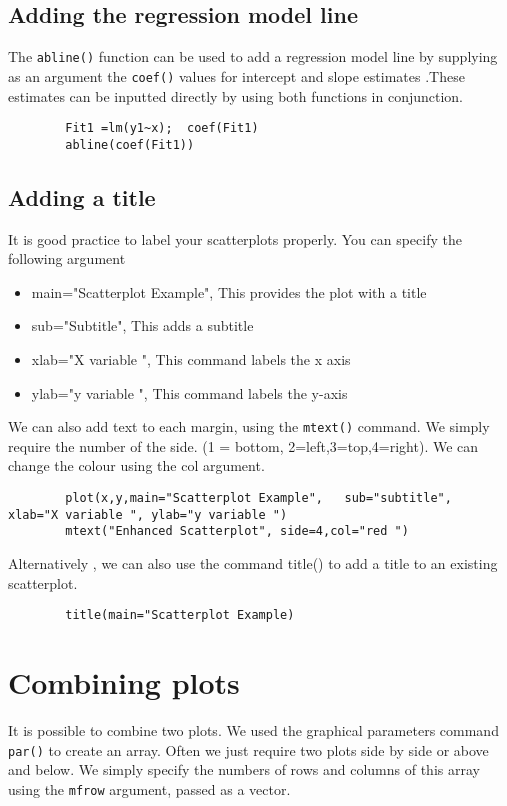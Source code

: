 \documentclass[a4paper,12pt]{article}
\begin{document}
\begin{itemize}
\begin{itemize}
		\subsection{Adding the regression model line}
		
		The \texttt{abline()} function can be used to add a regression model line  by supplying as an argument the \texttt{coef()} values for intercept and slope estimates .These estimates can be inputted directly by using both functions in conjunction.
		
		\large \begin{verbatim}
		Fit1 =lm(y1~x);  coef(Fit1)
		abline(coef(Fit1))	
		\end{verbatim}\large
		
		\subsection{Adding a title }
		
		It is good practice to label your scatterplots properly. You can specify the following argument
		\begin{itemize}
			\item	main="Scatterplot Example", 	This provides the plot with a title
			\item	sub="Subtitle",                 This adds a subtitle
			\item	xlab="X variable ",				This command labels the x axis 
			\item   ylab="y variable ",				This command labels the y-axis
		\end{itemize}
		We can also add text to each margin, using the \texttt{mtext()} command.  
		We simply require the number of the side. (1 = bottom, 2=left,3=top,4=right). 
		We can change the colour using the col argument.
		\large \begin{verbatim}
		plot(x,y,main="Scatterplot Example",   sub="subtitle",    xlab="X variable ", ylab="y variable ")	
		mtext("Enhanced Scatterplot", side=4,col="red ")
		\end{verbatim}\large
		Alternatively , we can also use the command title() to add a title to an existing scatterplot.
		\large \begin{verbatim}
		title(main="Scatterplot Example)	
		\end{verbatim}\large
		
		
		\section{Combining plots}
		It is possible to combine two plots. We used the graphical parameters command \texttt{par()} to create an array. 
		Often we just require two plots side by side or above and below. We simply specify the numbers of rows and columns of this array using the \texttt{mfrow} argument, passed as a vector.
		

\end{itemize}
\end{itemize}
\end{document}
